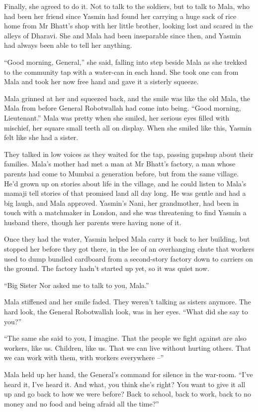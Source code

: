 Finally, she agreed to do it. Not to talk to the soldiers, but to
talk to Mala, who had been her friend since Yasmin had found her
carrying a huge sack of rice home from Mr Bhatt's shop with her
little brother, looking lost and scared in the alleys of Dharavi.
She and Mala had been inseparable since then, and Yasmin had always
been able to tell her anything.

``Good morning, General,'' she said, falling into step beside Mala as
she trekked to the community tap with a water-can in each hand. She
took one can from Mala and took her now free hand and gave it a
sisterly squeeze.

Mala grinned at her and squeezed back, and the smile was like the
old Mala, the Mala from before General Robotwallah had come into
being. ``Good morning, Lieutenant.'' Mala was pretty when she smiled,
her serious eyes filled with mischief, her square small teeth all
on display. When she smiled like this, Yasmin felt like she had a
sister.

They talked in low voices as they waited for the tap, passing
gupshup about their families. Mala's mother had met a man at Mr
Bhatt's factory, a man whose parents had come to Mumbai a
generation before, but from the same village. He'd grown up on
stories about life in the village, and he could listen to Mala's
mamaji tell stories of that promised land all day long. He was
gentle and had a big laugh, and Mala approved. Yasmin's Nani, her
grandmother, had been in touch with a matchmaker in London, and she
was threatening to find Yasmin a husband there, though her parents
were having none of it.

Once they had the water, Yasmin helped Mala carry it back to her
building, but stopped her before they got there, in the lee of an
overhanging chute that workers used to dump bundled cardboard from
a second-story factory down to carriers on the ground. The factory
hadn't started up yet, so it was quiet now.

``Big Sister Nor asked me to talk to you, Mala.''

Mala stiffened and her smile faded. They weren't talking as sisters
anymore. The hard look, the General Robotwallah look, was in her
eyes. ``What did she say to you?''

``The same she said to you, I imagine. That the people we fight
against are also workers, like us. Children, like us. That we can
live without hurting others. That we can work with them, with
workers everywhere --''

Mala held up her hand, the General's command for silence in the
war-room. ``I've heard it, I've heard it. And what, you think she's
right? You want to give it all up and go back to how we were
before? Back to school, back to work, back to no money and no food
and being afraid all the time?''

